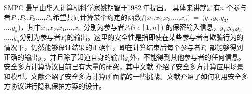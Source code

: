 SMPC 最早由华人计算机科学家姚期智于1982 年提出\cite{yao1982protocols}。 具体来讲就是有$n$ 个参与者$P_1$,$P_2$,$P_3$,...,$P_n$希望共同计算某个约定的函数$f$($x_1$,$x_2$,$x_3$,...,$x_n$)~=~($y_1$,$y_2$,$y_3$,\\ ...,$y_n$)，其中$x_1$,$x_2$,$x_3$,...,$x_n$ 分别为参与者$P_i$($i ~\epsilon ~[1,n]$) 的保密输入信息，$y_1$,$y_2$,$y_3$,...,$y_n$分别为参与者$P_i$的输出。这里的安全性是指即使在某些参与者有欺骗行为的情况下，仍然能够保证结果的正确性，即在计算结束后每个参与者$P_i$ 都能够得到正确的输出$y_i$，并且除了知道自身的输出$y_i$外，不能得到其他参与者的任何信息。安全多方计算协议目前已有大量的研究\cite{clifton2002tools}\cite{goldwasser1997multi}\cite{du2001secure}\cite{oleshchuk2007secure}，其中文献\cite{goldwasser1997multi} 介绍了安全多方计算应用场景和模型。文献\cite{goldwasser1997multi}\cite{oleshchuk2007secure}介绍了安全多方计算所面临的一些挑战。文献\cite{shi2011privacy}\cite{jung2013privacy}介绍了如何利用安全多方协议进行隐私保护方案的设计。

